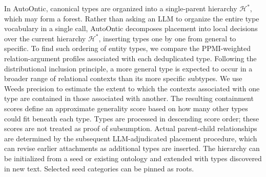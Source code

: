 \documentclass[11pt]{article}
\begin{document}
In AutoOntic, canonical types are organized into a single-parent hierarchy $\mathcal{H}^*$, which may form a forest. Rather than asking an LLM to organize the entire type vocabulary in a single call, AutoOntic decomposes placement into local decisions over the current hierarchy $\mathcal{H}^*$, inserting types one by one from general to specific. To find such ordering of entity types, we compare the PPMI-weighted relation-argument profiles associated with each deduplicated type. Following the distributional inclusion principle, a more general type is expected to occur in a broader range of relational contexts than its more specific subtypes. We use Weeds precision \citep{weeds2004characterising} to estimate the extent to which the contexts associated with one type are contained in those associated with another. The resulting containment scores define an approximate generality score based on how many other types could fit beneath each type. Types are processed in descending score order; these scores are not treated as proof of subsumption. Actual parent-child relationships are determined by the subsequent LLM-adjudicated placement procedure, which can revise earlier attachments as additional types are inserted. The hierarchy can be initialized from a seed or existing ontology and extended with types discovered in new text. Selected seed categories can be pinned as roots.


\end{document}
